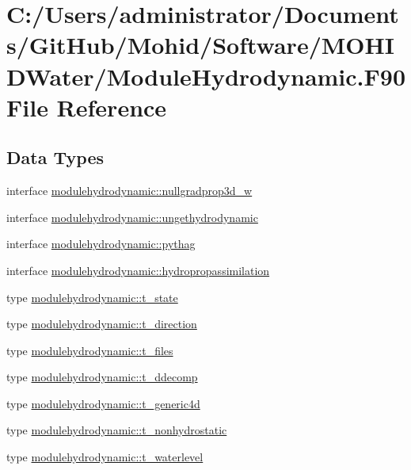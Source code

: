 \hypertarget{_module_hydrodynamic_8_f90}{}\section{C\+:/\+Users/administrator/\+Documents/\+Git\+Hub/\+Mohid/\+Software/\+M\+O\+H\+I\+D\+Water/\+Module\+Hydrodynamic.F90 File Reference}
\label{_module_hydrodynamic_8_f90}
\subsection*{Data Types}
\begin{DoxyCompactItemize}
\item 
interface \mbox{\hyperlink{interfacemodulehydrodynamic_1_1nullgradprop3d__w}{modulehydrodynamic\+::nullgradprop3d\+\_\+w}}
\item 
interface \mbox{\hyperlink{interfacemodulehydrodynamic_1_1ungethydrodynamic}{modulehydrodynamic\+::ungethydrodynamic}}
\item 
interface \mbox{\hyperlink{interfacemodulehydrodynamic_1_1pythag}{modulehydrodynamic\+::pythag}}
\item 
interface \mbox{\hyperlink{interfacemodulehydrodynamic_1_1hydropropassimilation}{modulehydrodynamic\+::hydropropassimilation}}
\item 
type \mbox{\hyperlink{structmodulehydrodynamic_1_1t__state}{modulehydrodynamic\+::t\+\_\+state}}
\item 
type \mbox{\hyperlink{structmodulehydrodynamic_1_1t__direction}{modulehydrodynamic\+::t\+\_\+direction}}
\item 
type \mbox{\hyperlink{structmodulehydrodynamic_1_1t__files}{modulehydrodynamic\+::t\+\_\+files}}
\item 
type \mbox{\hyperlink{structmodulehydrodynamic_1_1t__ddecomp}{modulehydrodynamic\+::t\+\_\+ddecomp}}
\item 
type \mbox{\hyperlink{structmodulehydrodynamic_1_1t__generic4d}{modulehydrodynamic\+::t\+\_\+generic4d}}
\item 
type \mbox{\hyperlink{structmodulehydrodynamic_1_1t__nonhydrostatic}{modulehydrodynamic\+::t\+\_\+nonhydrostatic}}
\item 
type \mbox{\hyperlink{structmodulehydrodynamic_1_1t__waterlevel}{modulehydrodynamic\+::t\+\_\+waterlevel}}
\item 

\end{DoxyCompactItemize}

